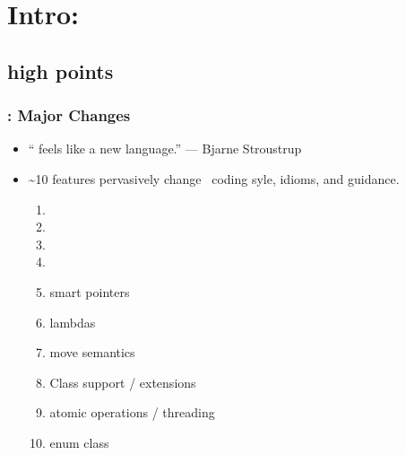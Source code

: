 \section{Intro: }

\lyxframeend{}\subsection[\CC 11]{{} high points}


\begin{frame}[fragile,t]
\frametitle{ : Major Changes}

\begin{itemize}

  \item \textquotedblleft{} feels like a new language.\textquotedblright{} --- Bjarne Stroustrup
    \pause{}

  \item \textasciitilde{}10 features pervasively change \CC\ coding
    syle, idioms, and guidance.
    \pause{}
    {\scriptsize
    \begin{enumerate}
    \item {}
    \item {}
    \item {}
    \item {}
    \item smart pointers
    \item lambdas
    \item move semantics
    \item Class support / extensions
    \item atomic operations / threading
    \item enum class
    \end{enumerate}
}
\end{itemize}

\end{frame}

\lyxframeend{}


